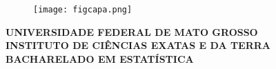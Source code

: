 \begin{capa}
\begin{figure}[h!]
	\centering
	\texttt{[image: figcapa.png]}
\end{figure}
\vspace*{-0.8cm}	
\center
\textbf{UNIVERSIDADE FEDERAL DE MATO GROSSO\\
INSTITUTO DE CIÊNCIAS EXATAS E DA TERRA\\
BACHARELADO EM ESTATÍSTICA}
\vspace*{2.9cm}


\textbf{\imprimirautor}
\vspace*{2.9cm}

\textbf{\imprimirtitulo}\\

\vspace*{\fill}

\textbf{\imprimirlocal\\
\imprimirdata}

\end{capa}


